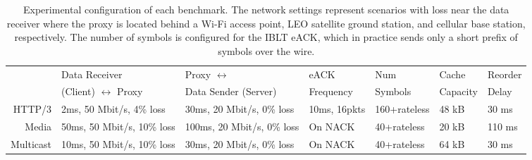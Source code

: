 \begin{table*}
    \centering
    \begin{tabular}{r l l l l l l}
        \toprule
        \bf
        & Data Receiver & Proxy $\leftrightarrow$ & eACK & Num & Cache & Reorder \\
        & (Client) $\leftrightarrow$ Proxy & Data Sender (Server) &  Frequency & Symbols & Capacity & Delay \\
        \midrule
         HTTP/3 & 2ms, 50 Mbit/s, 4\% loss & 30ms, 20 Mbit/s, 0\% loss & 10ms, 16pkts & 160+rateless & 48 kB & 30 ms \\
         Media & 50ms, 50 Mbit/s, 10\% loss & 100ms, 20 Mbit/s, 0\% loss & On NACK & 40+rateless & 20 kB & 110 ms \\
         Multicast & 10ms, 50 Mbit/s, 10\% loss & 30ms, 20 Mbit/s, 0\% loss & On NACK & 40+rateless & 64 kB & 30 ms \\
         \bottomrule
    \end{tabular}
    \caption{Experimental configuration of each  benchmark. The network settings
     represent scenarios with loss near the data receiver where the proxy is
     located behind a Wi-Fi access point, LEO satellite ground station, and
     cellular base station, respectively. The number of symbols is configured
     for the IBLT eACK, which in practice sends only a short prefix of symbols
     over the wire.
     }
    \label{tab:experiment-config}
\end{table*}